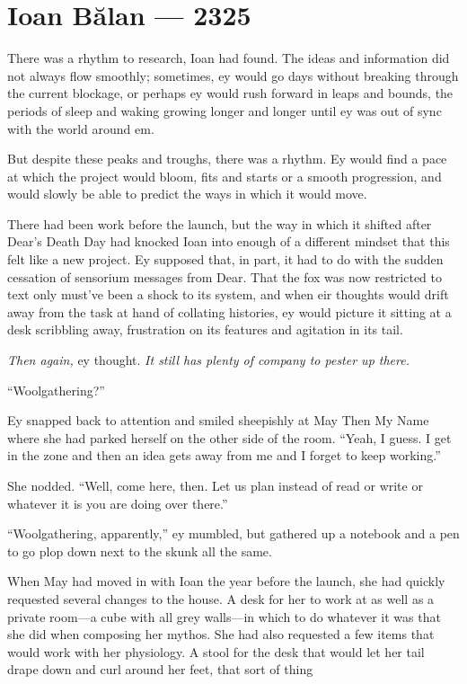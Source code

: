 \hypertarget{ioan-bux103lan—2325}{%
\chapter{Ioan Bălan — 2325}\label{ioan-bux103lan—2325}}

There was a rhythm to research, Ioan had found. The ideas and information did not always flow smoothly; sometimes, ey would go days without breaking through the current blockage, or perhaps ey would rush forward in leaps and bounds, the periods of sleep and waking growing longer and longer until ey was out of sync with the world around em.

But despite these peaks and troughs, there was a rhythm. Ey would find a pace at which the project would bloom, fits and starts or a smooth progression, and would slowly be able to predict the ways in which it would move.

There had been work before the launch, but the way in which it shifted after Dear's Death Day had knocked Ioan into enough of a different mindset that this felt like a new project. Ey supposed that, in part, it had to do with the sudden cessation of sensorium messages from Dear. That the fox was now restricted to text only must've been a shock to its system, and when eir thoughts would drift away from the task at hand of collating histories, ey would picture it sitting at a desk scribbling away, frustration on its features and agitation in its tail.

\emph{Then again,} ey thought. \emph{It still has plenty of company to pester up there.}

``Woolgathering?''

Ey snapped back to attention and smiled sheepishly at May Then My Name where she had parked herself on the other side of the room. ``Yeah, I guess. I get in the zone and then an idea gets away from me and I forget to keep working.''

She nodded. ``Well, come here, then. Let us plan instead of read or write or whatever it is you are doing over there.''

``Woolgathering, apparently,'' ey mumbled, but gathered up a notebook and a pen to go plop down next to the skunk all the same.

When May had moved in with Ioan the year before the launch, she had quickly requested several changes to the house. A desk for her to work at as well as a private room---a cube with all grey walls---in which to do whatever it was that she did when composing her mythos. She had also requested a few items that would work with her physiology. A stool for the desk that would let her tail drape down and curl around her feet, that sort of thing

